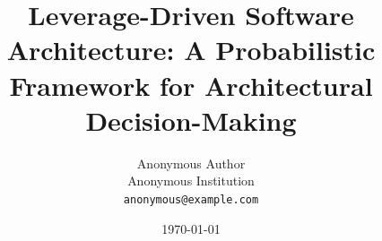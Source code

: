 \documentclass[11pt]{article}
\title{Leverage-Driven Software Architecture: A Probabilistic Framework for Architectural Decision-Making}
\author{Anonymous Author\\Anonymous Institution\\\texttt{anonymous@example.com}}
\date{\today}
\begin{document}
\maketitle

\begin{abstract}

\end{abstract}














\end{document}
